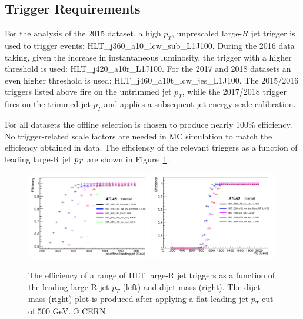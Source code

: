 \subsection{Trigger Requirements}
\label{subsec:trig}

For the analysis of the 2015 dataset, a high $p_T$, unprescaled large-$R$ jet trigger is used to trigger events: HLT\_j360\_a10\_lcw\_sub\_L1J100. During the 2016 data taking, given the increase in instantaneous luminosity, the trigger with a higher threshold is used: HLT\_j420\_a10r\_L1J100. For the 2017 and 2018 datasets an even higher threshold is used: HLT\_j460\_a10t\_lcw\_jes\_L1J100. The 2015/2016 triggers listed above fire on the untrimmed jet $p_T$, while the 2017/2018 trigger fires on the trimmed jet $p_T$ and applies a subsequent jet energy scale calibration.

For all datasets the offline selection is chosen to produce nearly 100\% efficiency. No trigger-related scale factors are needed in MC simulation to match the efficiency obtained in data.
The efficiency of the relevant triggers as a function of leading large-R jet $p_{T}$ are shown in Figure~\ref{fig:trigeffturnon}.

\begin{figure}[htbp!]
\begin{center}
\includegraphics[width=0.49\textwidth]{trigger_eff_vs_pt.png}
\includegraphics[width=0.49\textwidth]{trigger_eff_vs_mjj.png}
\end{center}
\caption{
    The efficiency of a range of HLT large-R jet triggers as a function of the leading large-R jet $p_T$ (left) and dijet mass (right).
    The dijet mass (right) plot is produced after applying a flat leading jet $p_T$ cut of 500 GeV.
    © CERN
}
\label{fig:trigeffturnon}
\end{figure}

